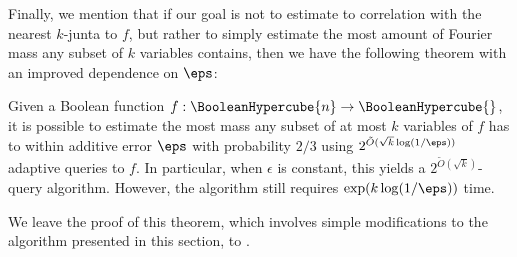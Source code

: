 Finally, we mention that if our goal is not to estimate to correlation with the nearest $k$-junta to $f$, but rather to simply estimate the most amount of Fourier mass any subset of $k$ variables contains, then we have the following theorem with an improved dependence on $\eps$:
\begin{theorem}
\label{theorem:main-result-mass}
Given a Boolean function $f: \BooleanHypercube{n} \to \BooleanHypercube{}$, it is possible to estimate the most mass any subset of at most $k$ variables of $f$ has to within additive error $\eps$ with probability $2/3$ using 
$ 2^{\tilde{O}(\sqrt{k}\log(1/\eps))}$ adaptive queries to $f$. In particular, when $\epsilon$ is constant, this yields a $2^{\tilde{O}(\sqrt{k})}$-query algorithm. However, the algorithm still requires $\exp(k\log(1/\eps))$ time.
\end{theorem}

We leave the proof of this theorem, which involves simple modifications to the algorithm presented in this section, to .
 

